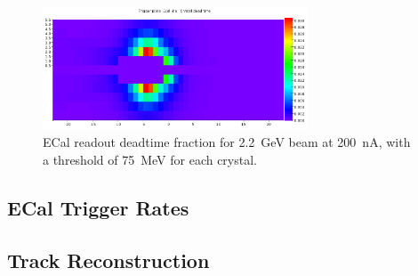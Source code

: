\begin{figure}[ht]
	\includegraphics[width=0.7\textwidth]{performance/ecal_deadtime_22}
	\caption{\small{ECal readout deadtime fraction for 2.2~GeV beam at 200~nA, 
with a threshold of 75~MeV for each crystal.}}
	\label{fig:ecal_deadtime}
\end{figure}

\subsection{ECal Trigger Rates}
\label{sec:ecaltrigg}





\subsection{Track Reconstruction}




